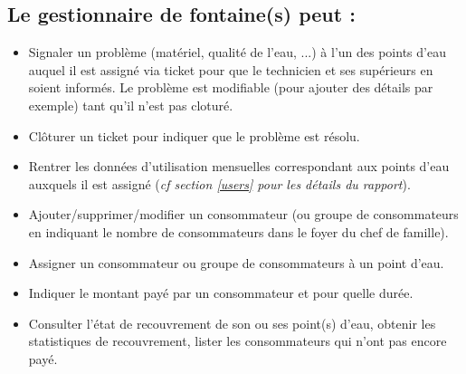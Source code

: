 \documentclass[a4paper, 11pt]{article}
\begin{document}
\subsection{Le gestionnaire de fontaine(s) peut :}
\begin{itemize}
  \item Signaler un problème (matériel, qualité de l'eau, ...) à l'un des points d'eau auquel il est assigné via ticket pour que le technicien et ses supérieurs en soient informés. Le problème est modifiable (pour ajouter des détails par exemple) tant qu'il n'est pas cloturé.
  \item Clôturer un ticket pour indiquer que le problème est résolu.
  \item Rentrer les données d'utilisation mensuelles correspondant aux points d'eau auxquels il est assigné (\emph{cf section \ref{users} pour les détails du rapport}).
  \item Ajouter/supprimer/modifier un consommateur (ou groupe de consommateurs en indiquant le nombre de consommateurs dans le foyer du chef de famille).
  \item Assigner un consommateur ou groupe de consommateurs à un point d'eau.
  \item Indiquer le montant payé par un consommateur et pour quelle durée.
  \item Consulter l'état de recouvrement de son ou ses point(s) d'eau, obtenir les statistiques de recouvrement, lister les consommateurs qui n'ont pas encore payé.
\end{itemize}

\end{document}
